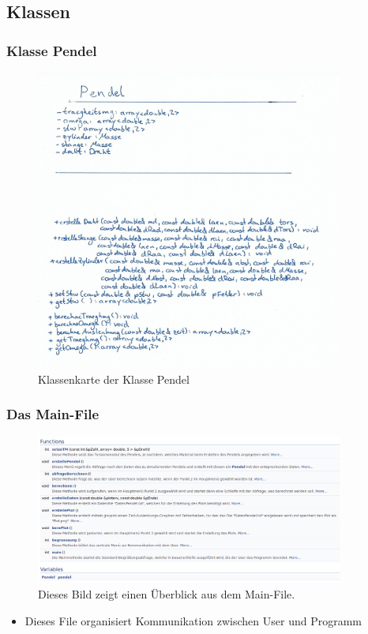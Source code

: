 \documentclass[11pt]{beamer}
\begin{document}
\subsection{Klassen}
\begin{frame}
\frametitle{Klasse Pendel}
\begin{figure} [H]
\centering
\includegraphics[width=0.9\textwidth]{info_1.jpg}
\caption{Klassenkarte der Klasse Pendel}
\end{figure}
\end{frame}

\begin{frame}
\frametitle{Das Main-File}
\begin{figure} [H]
\centering
\includegraphics[width=0.9\textwidth]{main.jpg}
\caption{Dieses Bild zeigt einen Überblick aus dem Main-File.}
\end{figure}
\begin{itemize}
\item Dieses File organisiert Kommunikation zwischen User und Programm
\end{itemize}
\end{frame}
\end{document}
